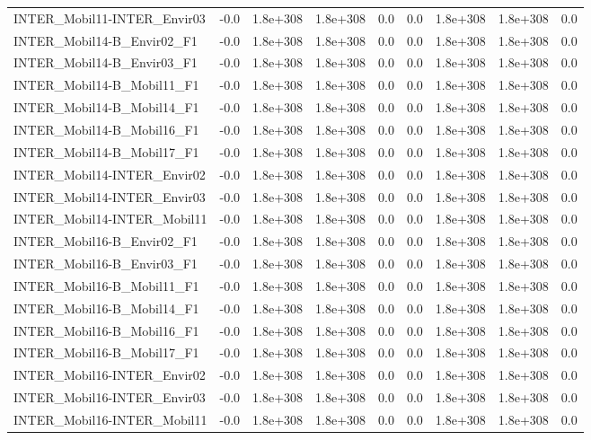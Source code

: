 \begin{tabular}{lrrrrrrrr}
INTER_Mobil11-INTER_Envir03 & -0.0 & 1.8e+308 & 1.8e+308 & 0.0 & 0.0 & 1.8e+308 & 1.8e+308 & 0.0 \\
INTER_Mobil14-B_Envir02_F1 & -0.0 & 1.8e+308 & 1.8e+308 & 0.0 & 0.0 & 1.8e+308 & 1.8e+308 & 0.0 \\
INTER_Mobil14-B_Envir03_F1 & -0.0 & 1.8e+308 & 1.8e+308 & 0.0 & 0.0 & 1.8e+308 & 1.8e+308 & 0.0 \\
INTER_Mobil14-B_Mobil11_F1 & -0.0 & 1.8e+308 & 1.8e+308 & 0.0 & 0.0 & 1.8e+308 & 1.8e+308 & 0.0 \\
INTER_Mobil14-B_Mobil14_F1 & -0.0 & 1.8e+308 & 1.8e+308 & 0.0 & 0.0 & 1.8e+308 & 1.8e+308 & 0.0 \\
INTER_Mobil14-B_Mobil16_F1 & -0.0 & 1.8e+308 & 1.8e+308 & 0.0 & 0.0 & 1.8e+308 & 1.8e+308 & 0.0 \\
INTER_Mobil14-B_Mobil17_F1 & -0.0 & 1.8e+308 & 1.8e+308 & 0.0 & 0.0 & 1.8e+308 & 1.8e+308 & 0.0 \\
INTER_Mobil14-INTER_Envir02 & -0.0 & 1.8e+308 & 1.8e+308 & 0.0 & 0.0 & 1.8e+308 & 1.8e+308 & 0.0 \\
INTER_Mobil14-INTER_Envir03 & -0.0 & 1.8e+308 & 1.8e+308 & 0.0 & 0.0 & 1.8e+308 & 1.8e+308 & 0.0 \\
INTER_Mobil14-INTER_Mobil11 & -0.0 & 1.8e+308 & 1.8e+308 & 0.0 & 0.0 & 1.8e+308 & 1.8e+308 & 0.0 \\
INTER_Mobil16-B_Envir02_F1 & -0.0 & 1.8e+308 & 1.8e+308 & 0.0 & 0.0 & 1.8e+308 & 1.8e+308 & 0.0 \\
INTER_Mobil16-B_Envir03_F1 & -0.0 & 1.8e+308 & 1.8e+308 & 0.0 & 0.0 & 1.8e+308 & 1.8e+308 & 0.0 \\
INTER_Mobil16-B_Mobil11_F1 & -0.0 & 1.8e+308 & 1.8e+308 & 0.0 & 0.0 & 1.8e+308 & 1.8e+308 & 0.0 \\
INTER_Mobil16-B_Mobil14_F1 & -0.0 & 1.8e+308 & 1.8e+308 & 0.0 & 0.0 & 1.8e+308 & 1.8e+308 & 0.0 \\
INTER_Mobil16-B_Mobil16_F1 & -0.0 & 1.8e+308 & 1.8e+308 & 0.0 & 0.0 & 1.8e+308 & 1.8e+308 & 0.0 \\
INTER_Mobil16-B_Mobil17_F1 & -0.0 & 1.8e+308 & 1.8e+308 & 0.0 & 0.0 & 1.8e+308 & 1.8e+308 & 0.0 \\
INTER_Mobil16-INTER_Envir02 & -0.0 & 1.8e+308 & 1.8e+308 & 0.0 & 0.0 & 1.8e+308 & 1.8e+308 & 0.0 \\
INTER_Mobil16-INTER_Envir03 & -0.0 & 1.8e+308 & 1.8e+308 & 0.0 & 0.0 & 1.8e+308 & 1.8e+308 & 0.0 \\
INTER_Mobil16-INTER_Mobil11 & -0.0 & 1.8e+308 & 1.8e+308 & 0.0 & 0.0 & 1.8e+308 & 1.8e+308 & 0.0 \\

\end{tabular}
